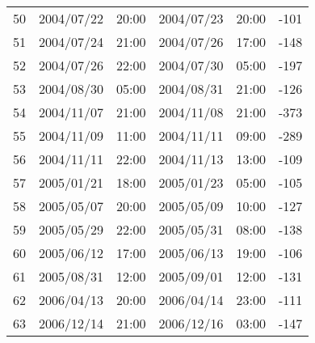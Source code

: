 \begin{table}[h]
\begin{tabular}{cccccc}
    50 & 2004/07/22 & 20:00 & 2004/07/23 & 20:00 & -101 \\
    51 & 2004/07/24 & 21:00 & 2004/07/26 & 17:00 & -148 \\
    52 & 2004/07/26 & 22:00 & 2004/07/30 & 05:00 & -197 \\
    53 & 2004/08/30 & 05:00 & 2004/08/31 & 21:00 & -126 \\
    54 & 2004/11/07 & 21:00 & 2004/11/08 & 21:00 & -373 \\
    55 & 2004/11/09 & 11:00 & 2004/11/11 & 09:00 & -289 \\
    56 & 2004/11/11 & 22:00 & 2004/11/13 & 13:00 & -109 \\
    57 & 2005/01/21 & 18:00 & 2005/01/23 & 05:00 & -105 \\
    58 & 2005/05/07 & 20:00 & 2005/05/09 & 10:00 & -127 \\
    59 & 2005/05/29 & 22:00 & 2005/05/31 & 08:00 & -138 \\
    60 & 2005/06/12 & 17:00 & 2005/06/13 & 19:00 & -106 \\
    61 & 2005/08/31 & 12:00 & 2005/09/01 & 12:00 & -131 \\
    62 & 2006/04/13 & 20:00 & 2006/04/14 & 23:00 & -111 \\
    63 & 2006/12/14 & 21:00 & 2006/12/16 & 03:00 & -147 \\ \hline
    \end{tabular}%
    \end{table}
    



